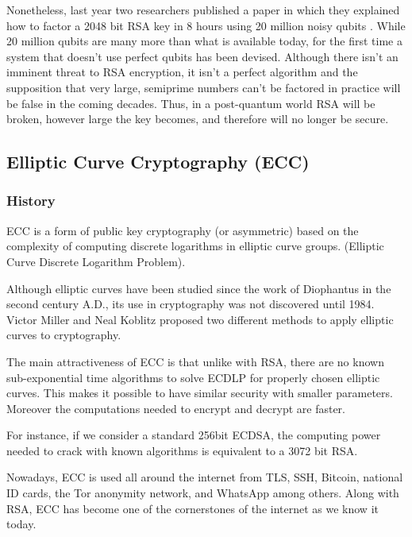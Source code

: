 Nonetheless, last year two researchers published a paper in which they 
explained how to factor a 2048 bit RSA key in 8 hours using 20 million 
noisy qubits \cite{gidney_how_2019}. While 20 million qubits are many 
more than what is 
available today, for the first time a system that doesn’t use perfect 
qubits has been devised. Although there isn’t an imminent threat to RSA 
encryption, it isn’t a perfect algorithm and the supposition that very 
large, semiprime numbers can’t be factored in practice will be false in 
the coming decades. Thus, in a post-quantum world RSA will be 
broken, however large the key becomes, and therefore will no longer be 
secure.



\pagebreak
\subsection{Elliptic Curve Cryptography (ECC)}

\subsubsection{History}

ECC is a form of public key cryptography (or asymmetric) based on the complexity
of computing discrete logarithms in elliptic curve groups. (Elliptic Curve
Discrete Logarithm Problem).

Although elliptic curves have been studied since the work of Diophantus in the
second century A.D., its use in cryptography was not discovered until 1984.
Victor Miller and Neal Koblitz proposed two different methods to apply elliptic
curves to cryptography. \cite{barsagade_overview_2014}

The main attractiveness of ECC is that unlike with RSA, there are no known
sub-exponential time algorithms to solve ECDLP for properly chosen elliptic
curves. This makes it possible to have similar security with smaller parameters.
Moreover the computations needed to encrypt and decrypt are faster.

For instance, if we consider a standard 256bit ECDSA, the computing power needed
to crack with known algorithms is equivalent to a 3072 bit RSA.
\cite{roetteler_quantum_2017}

Nowadays, ECC is used all around the internet from TLS, SSH, Bitcoin, national
ID cards, the Tor anonymity network, and WhatsApp among others. Along with RSA,
ECC has become one of the cornerstones of the internet as we know it today.

